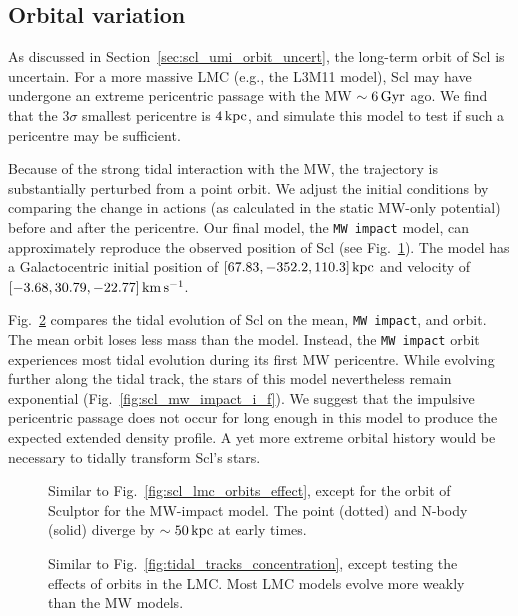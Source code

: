 \subsection{Orbital variation}\label{orbital-variation}

As discussed in Section~\ref{sec:scl_umi_orbit_uncert}, the long-term
orbit of Scl is uncertain. For a more massive LMC (e.g., the L3M11
model), Scl may have undergone an extreme pericentric passage with the
MW \(\sim 6\,{\rm Gyr}\) ago. We find that the 3\(\sigma\) smallest
pericentre is \(4\,{\rm kpc}\), and simulate this model to test if such a
pericentre may be sufficient.

Because of the strong tidal interaction with the MW, the trajectory is
substantially perturbed from a point orbit. We adjust the initial
conditions by comparing the change in actions (as calculated in the
static MW-only potential) before and after the pericentre. Our final
model, the \texttt{MW\ impact} model, can approximately reproduce the
observed position of Scl (see Fig.~\ref{fig:scl_mw_impact_orbit}). The
model has a Galactocentric initial position of
\([67.83, -352.2, 110.3]\,{\rm kpc}\) and velocity of
\([-3.68, 30.79, -22.77]\,{\rm km\,s^{-1}}\).

Fig.~\ref{fig:tidal_tracks_umi} compares the tidal evolution of Scl on
the mean, \texttt{MW\ impact}, and \smallperi{} orbit. The mean orbit
loses less mass than the \smallperi{} model. Instead, the
\texttt{MW\ impact} orbit experiences most tidal evolution during its
first MW pericentre. While evolving further along the tidal track, the
stars of this model nevertheless remain exponential
(Fig.~\ref{fig:scl_mw_impact_i_f}). We suggest that the impulsive
pericentric passage does not occur for long enough in this model to
produce the expected extended density profile. A yet more extreme
orbital history would be necessary to tidally transform Scl's stars.

\begin{figure}
\centering
{}
\caption[Sculptor MW impact orbit]{Similar to
Fig.~\ref{fig:scl_lmc_orbits_effect}, except for the orbit of Sculptor
for the MW-impact model. The point (dotted) and N-body (solid) diverge
by \(\sim 50\,{\rm kpc}\) at early times.}\label{fig:scl_mw_impact_orbit}
\end{figure}

\begin{figure}
\centering
{}
\caption[Sculptor's tidal evolution for different orbits]{Similar to
Fig.~\ref{fig:tidal_tracks_concentration}, except testing the effects of
orbits in the LMC. Most LMC models evolve more weakly than the MW
models.}\label{fig:tidal_tracks_umi}
\end{figure}

